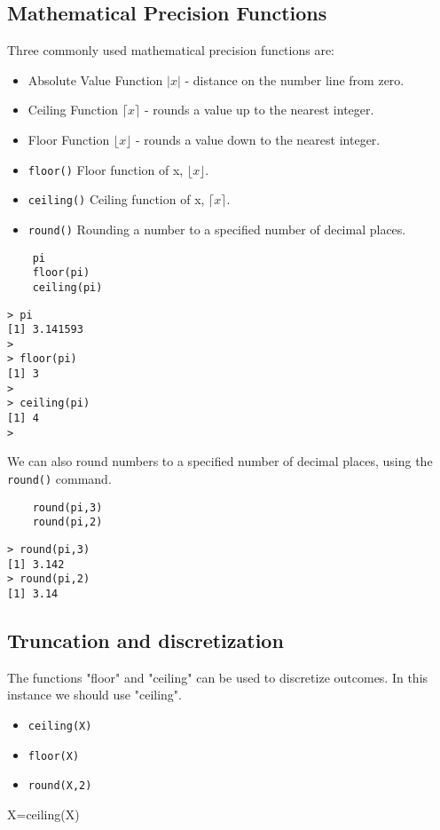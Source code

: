 \documentclass[a4paper,12pt]{article}
\begin{document}
\subsection{Mathematical Precision Functions}
Three commonly used mathematical precision functions are:
\begin{itemize}
	\item Absolute Value Function $| x |$ - distance on the number line from zero.
	\item Ceiling Function $\lceil x \rceil$ - rounds a value up to the nearest integer.
	\item Floor Function  $\lfloor x \rfloor $ - rounds a value down to the nearest integer.
\end{itemize}
\begin{itemize}
	\item \texttt{floor()} Floor function of x, $\lfloor x \rfloor$.
	\item \texttt{ceiling()} Ceiling function of x, $\lceil x \rceil$.
	\item \texttt{round()} Rounding a number to a specified number of decimal places.
\end{itemize}

\begin{framed}
	\begin{verbatim}
	pi
	floor(pi)
	ceiling(pi)
	\end{verbatim}
\end{framed}
\begin{verbatim}
> pi
[1] 3.141593
>
> floor(pi)
[1] 3
>
> ceiling(pi)
[1] 4
>
\end{verbatim}
We can also round numbers to a specified number of decimal places, using the \texttt{round()} command.
\begin{framed}
	\begin{verbatim}
	round(pi,3)
	round(pi,2)
	\end{verbatim}
\end{framed}
\begin{verbatim}
> round(pi,3)
[1] 3.142
> round(pi,2)
[1] 3.14
\end{verbatim}


\subsection{Truncation and discretization}

The functions "floor" and "ceiling" can be used to discretize outcomes. In this instance we should use "ceiling".
\begin{itemize}
\item \texttt{ceiling(X)}
\item \texttt{floor(X)}
\item \texttt{round(X,2)}
\end{itemize}
X=ceiling(X)
\end{document}
